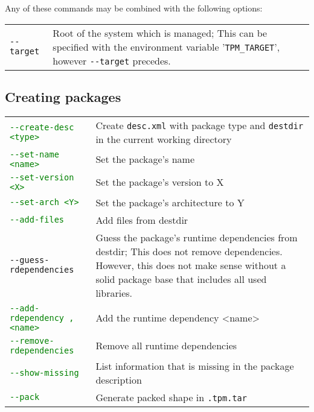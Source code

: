 \documentclass[a4paper]{article}
\newcommand{\file}[1]{\texttt{#1}}
\newcommand{\variable}[1]{'\texttt{#1}'}
\newcommand{\green}[1]{\textcolor{green}{#1}}
\begin{document}
	\vspace{1em}
	Any of these commands may be combined with the following options: \\
	\bgroup
	\def\arraystretch{1.5}
	\begin{tabularx}{\textwidth}{lX}
		\texttt{-{}-target} & Root of the system which is managed; This can be specified with the environment variable \variable{TPM\_TARGET}, however \texttt{-{}-target} precedes. \\
	\end{tabularx}
	\egroup
	
	\subsection{Creating packages}
	\label{sec:creating_packages}
	
	\bgroup
	\def\arraystretch{1.5}
	\begin{tabularx}{\textwidth}{lX}
		\green{\texttt{-{}-create-desc <type>}} & Create \file{desc.xml} with package type and \file{destdir} in the current working directory \\
		
		\green{\texttt{-{}-set-name <name>}} & Set the package's name \\
		
		\green{\texttt{-{}-set-version <X>}} & Set the package's version to X \\
		
		\green{\texttt{-{}-set-arch <Y>}} & Set the package's architecture to Y \\
		
		\green{\texttt{-{}-add-files}} & Add files from destdir \\
		
		\texttt{-{}-guess-rdependencies} & Guess the package's runtime dependencies from destdir; This does not remove dependencies. However, this does not make sense without a solid package base that includes all used libraries. \\
		
		\green{\texttt{-{}-add-rdependency ,<name>}} & Add the runtime dependency <name> \\
		
		\green{\texttt{-{}-remove-rdependencies}} & Remove all runtime dependencies \\
		
		\green{\texttt{-{}-show-missing}} & List information that is missing in the package description \\
		
		\green{\texttt{-{}-pack}} & Generate packed shape in \texttt{.tpm.tar}
	\end{tabularx}
	\egroup
\end{document}
